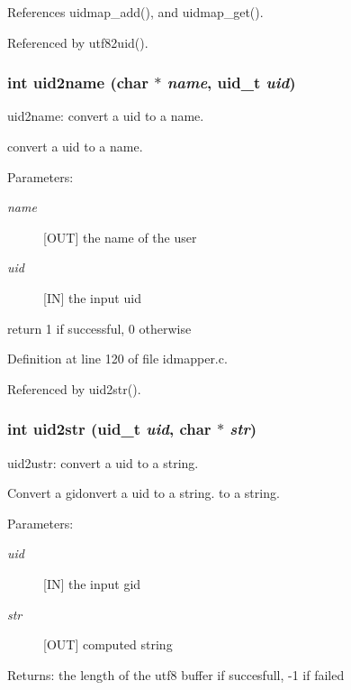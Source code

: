 References uidmap\_\-add(), and uidmap\_\-get().

Referenced by utf82uid().
\subsubsection{\setlength{\rightskip}{0pt plus 5cm}int uid2name (char $\ast$ {\em name}, uid\_\-t {\em uid})}\label{idmapper_8c_a0}


uid2name: convert a uid to a name.

convert a uid to a name.

\begin{Desc}
\item[Parameters:]
\begin{description}
\item[{\em name}][OUT] the name of the user \item[{\em uid}][IN] the input uid\end{description}
\end{Desc}
return 1 if successful, 0 otherwise 

Definition at line 120 of file idmapper.c.

Referenced by uid2str().
\subsubsection{\setlength{\rightskip}{0pt plus 5cm}int uid2str (uid\_\-t {\em uid}, char $\ast$ {\em str})}\label{idmapper_8c_a4}


uid2ustr: convert a uid to a string.

Convert a gidonvert a uid to a string. to a string.

\begin{Desc}
\item[Parameters:]
\begin{description}
\item[{\em uid}][IN] the input gid \item[{\em str}][OUT] computed string\end{description}
\end{Desc}
\begin{Desc}
\item[Returns:]the length of the utf8 buffer if succesfull, -1 if failed \end{Desc}


